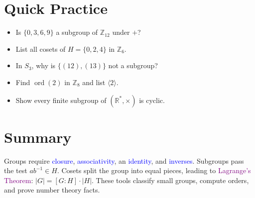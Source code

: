 \documentclass[12pt]{article}
\begin{document}
\section*{Quick Practice}
\begin{itemize}
  \item Is $\{0,3,6,9\}$ a subgroup of $\mathbb{Z}_{12}$ under $+$?
  \item List all cosets of $H=\{0,2,4\}$ in $\mathbb{Z}_6$.
  \item In $S_3$, why is $\{(12),(13)\}$ not a subgroup?
  \item Find $\operatorname{ord}(2)$ in $\mathbb{Z}_8$ and list $\langle2\rangle$.
  \item Show every finite subgroup of $(\mathbb{R}^*,\times)$ is cyclic.
\end{itemize}

\section*{Summary}
Groups require \textcolor{blue}{closure}, \textcolor{blue}{associativity}, an \textcolor{blue}{identity}, and \textcolor{blue}{inverses}. Subgroups pass the test $ab^{-1}\in H$. Cosets split the group into equal pieces, leading to \textcolor{purple}{Lagrange's Theorem}: $|G|=[G:H]\cdot|H|$. These tools classify small groups, compute orders, and prove number theory facts.
\end{document}
